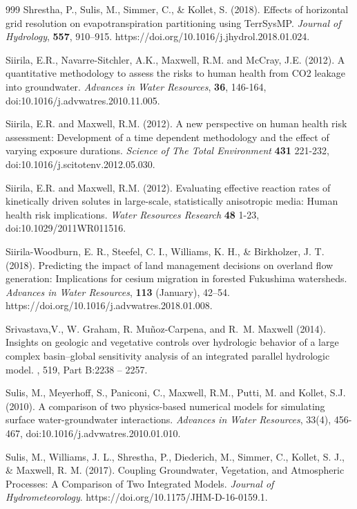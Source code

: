 \begin{thebibliography}{999}
Shrestha, P., Sulis, M., Simmer, C., \& Kollet, S. (2018). Effects of horizontal grid resolution on evapotranspiration partitioning using TerrSysMP. {\em Journal of Hydrology}, {\bf 557}, 910–915. https://doi.org/10.1016/j.jhydrol.2018.01.024.

Siirila, E.R., Navarre-Sitchler, A.K., Maxwell, R.M. and McCray, J.E. (2012). A quantitative methodology to assess the risks to human health from CO2 leakage into groundwater. {\em Advances in Water Resources}, {\bf 36}, 146-164, doi:10.1016/j.advwatres.2010.11.005.

Siirila, E.R. and Maxwell, R.M. (2012). A new perspective on human health risk assessment: Development of a time dependent methodology and the effect of varying exposure durations. {\em Science of The Total Environment} {\bf 431} 221-232, doi:10.1016/j.scitotenv.2012.05.030.

Siirila, E.R. and Maxwell, R.M. (2012). Evaluating effective reaction rates of kinetically driven solutes in large-scale, statistically anisotropic media: Human health risk implications. {\em Water Resources Research} {\bf 48} 1-23, doi:10.1029/2011WR011516.

Siirila-Woodburn, E. R., Steefel, C. I., Williams, K. H., \& Birkholzer, J. T. (2018). Predicting the impact of land management decisions on overland flow generation: Implications for cesium migration in forested Fukushima watersheds. {\em Advances in Water Resources}, {\bf 113} (January), 42–54. https://doi.org/10.1016/j.advwatres.2018.01.008.

Srivastava,V., W. Graham, R. Muñoz-Carpena, and R.~M. Maxwell (2014).
\newblock Insights on geologic and vegetative controls over hydrologic behavior
  of a large complex basin--global sensitivity analysis of an integrated
  parallel hydrologic model.
, 519, Part B:2238 -- 2257.


Sulis, M., Meyerhoff, S., Paniconi, C., Maxwell, R.M., Putti, M. and Kollet, S.J. (2010). A comparison of two physics-based numerical models for simulating surface water-groundwater interactions. { \em Advances in Water Resources}, 33(4), 456-467, doi:10.1016/j.advwatres.2010.01.010.

Sulis, M., Williams, J. L., Shrestha, P., Diederich, M., Simmer, C., Kollet, S. J., \& Maxwell, R. M. (2017). Coupling Groundwater, Vegetation, and Atmospheric Processes: A Comparison of Two Integrated Models. {\em Journal of Hydrometeorology}. https://doi.org/10.1175/JHM-D-16-0159.1.



\end{thebibliography}
